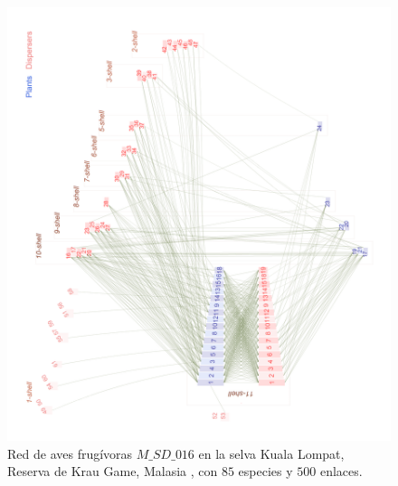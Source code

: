 \clearpage
\begin{figure}[ht!]
\centering
\includegraphics[scale=0.20]{Figures/VIS_M_SD_016_ziggurat.png}
\caption {Red de aves frugívoras $M\_SD\_016$ en la selva Kuala Lompat, Reserva de Krau Game, Malasia \cite{lambert1989fig}, con $85$ especies y $500$ enlaces.}
\label{fig:VIS_M_PL_047_ziggurat}
\end{figure}

